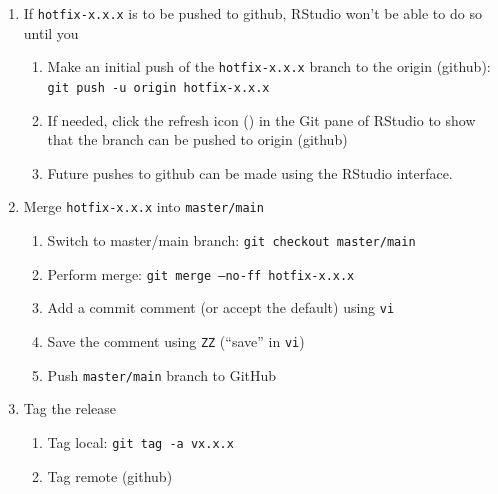 \documentclass{article}
\begin{document}
\begin{enumerate}
  \item If \texttt{hotfix-x.x.x} is to be pushed to github, RStudio won't be able to do so until you
  \begin{enumerate}

    \item Make an initial push of the \texttt{hotfix-x.x.x} branch
  	      to the origin (github):
  		  \texttt{git push -u origin hotfix-x.x.x}

	\item If needed, click the refresh icon
  		  () in the Git pane of RStudio to
  		  show that the branch can be pushed to origin (github)

  	\item Future pushes to github can be made using the RStudio interface.

  \end{enumerate}
  \item Merge \texttt{hotfix-x.x.x} into \texttt{master/main}
  \begin{enumerate}

    \item Switch to master/main branch: \texttt{git checkout master/main}

    \item Perform merge: \texttt{git merge --no-ff hotfix-x.x.x}

	\item Add a commit comment (or accept the default) using \texttt{vi}

	\item Save the comment using \texttt{ZZ} (``save'' in \texttt{vi})

	\item Push \texttt{master/main} branch to GitHub

  \end{enumerate}
  \item Tag the release
  \begin{enumerate}

    \item Tag local: \texttt{git tag -a vx.x.x}

    \item Tag remote (github)
	\begin{enumerate}


\end{enumerate}
\end{enumerate}
\end{enumerate}
\end{document}
